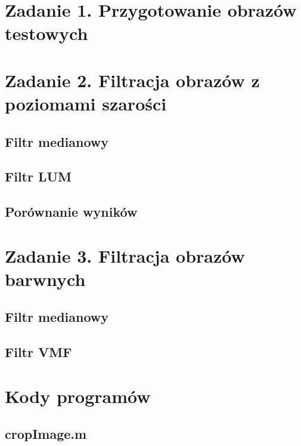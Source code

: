 





 


\section*{Zadanie 1. Przygotowanie obrazów testowych}


\section*{Zadanie 2. Filtracja obrazów z poziomami szarości}
\subsection*{Filtr medianowy}


\subsection*{Filtr LUM}


\subsection*{Porównanie wyników}


\section*{Zadanie 3. Filtracja obrazów barwnych} 
\subsection*{Filtr medianowy}


\subsection*{Filtr VMF}



\newpage \section*{Kody programów}

\subsection*{ cropImage.m         } \newpage
